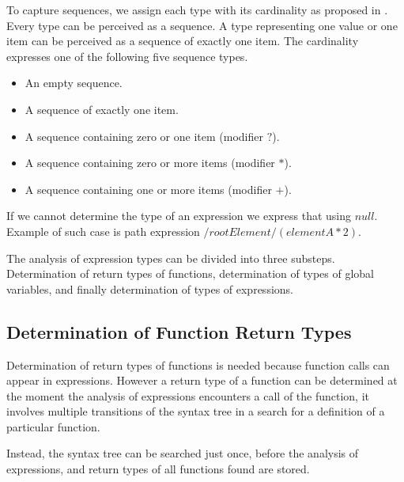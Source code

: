 
To capture sequences, we assign each type with its cardinality as proposed in . Every type can be perceived as a sequence. A type representing one value or one item can be perceived as a sequence of exactly one item. The cardinality expresses one of the following five sequence types.

\begin{itemize}
\item An empty sequence.
\item A sequence of exactly one item.
\item A sequence containing zero or one item (modifier $?$).
\item A sequence containing zero or more items (modifier $*$).
\item A sequence containing one or more items (modifier $+$).
\end{itemize}

If we cannot determine the type of an expression we express that using $null$. Example of such case is path expression $/rootElement/(elementA * 2)$. 

The analysis of expression types can be divided into three substeps. Determination of return types of functions, determination of types of global variables, and finally determination of types of expressions.


\subsection{Determination of Function Return Types}
Determination of return types of functions is needed because function calls can appear in expressions. However a return type of a function can be determined at the moment the analysis of expressions encounters a call of the function, it involves multiple transitions of the syntax tree in a search for a definition of a particular function.

Instead, the syntax tree can be searched just once, before the analysis of expressions, and return types of all functions found are stored.

